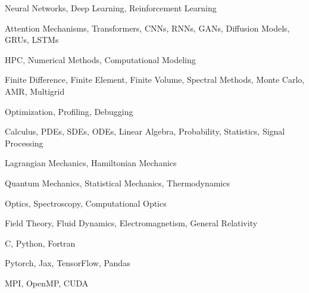 

\begin{cventries}
  {
    \begin{cvitems}
    \item Neural Networks, Deep Learning, Reinforcement Learning
    \item Attention Mechanisms, Transformers, CNNs, RNNs, GANs, Diffusion Models, GRUs, LSTMs
    \end{cvitems}
  }

  {
    \begin{cvitems}
    \item HPC, Numerical Methods, Computational Modeling
    \item Finite Difference, Finite Element, Finite Volume, Spectral Methods, Monte Carlo, AMR, Multigrid
    \item Optimization, Profiling, Debugging
    \end{cvitems}
  }

  {
    \begin{cvitems}
    \item Calculus, PDEs, SDEs, ODEs, Linear Algebra, Probability, Statistics, Signal Processing
    \item Lagrangian Mechanics, Hamiltonian Mechanics
    \item Quantum Mechanics, Statistical Mechanics, Thermodynamics
    \item Optics, Spectroscopy, Computational Optics
    \item Field Theory, Fluid Dynamics, Electromagnetism, General Relativity
    \end{cvitems}
  }

  {
    \begin{cvitems}
    \item C, Python, Fortran 
    \item Pytorch, Jax, TensorFlow, Pandas
    \item MPI, OpenMP, CUDA
    \end{cvitems}
  }


\end{cventries}
